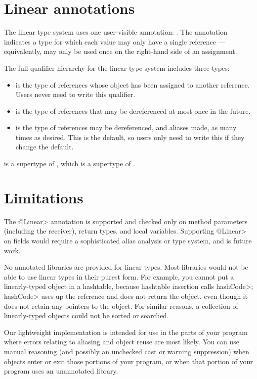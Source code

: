 \section{Linear annotations\label{linear-annotations}}

The linear type system uses one user-visible annotation:
.  The annotation indicates
a type for which each value may only have a single reference ---
equivalently, may only be used once on the right-hand side of an
assignment.

The full qualifier hierarchy for the linear type system includes three
types:
\begin{itemize}
\item
{} is the type of references whose object has been assigned to
another reference.  Users never need to write this qualifier.
\item
{} is the type of references that may be dereferenced at
most once in the future.
\item
{} is the type of references may be dereferenced, and
aliases made, as many times as desired.  This is the default, so users only
need to write this if they change the default.
\end{itemize}


\noindent
{} is a supertype of , which is a
supertype of .



\section{Limitations\label{linear-limitations}}

The \<@Linear> annotation is supported and checked only on method
parameters (including the receiver), return types, and local variables.
Supporting \<@Linear> on fields would require a sophisticated alias
analysis or type system, and is future work.

No annotated libraries are provided for linear types.  Most libraries would
not be able to use linear types in their purest form.  For example, you
cannot put a linearly-typed object in a hashtable, because hashtable
insertion calls \<hashCode>; \<hashCode> uses up the reference and does not
return the object, even though it does not retain any pointers to the
object.  For similar reasons, a collection of linearly-typed objects could
not be sorted or searched.

Our lightweight implementation is intended for use in the parts of your
program where errors relating to aliasing and object reuse are most likely.
You can use manual reasoning (and possibly an unchecked cast or warning
suppression) when objects enter or exit those portions of your program, or
when that portion of your program uses an unannotated library.


